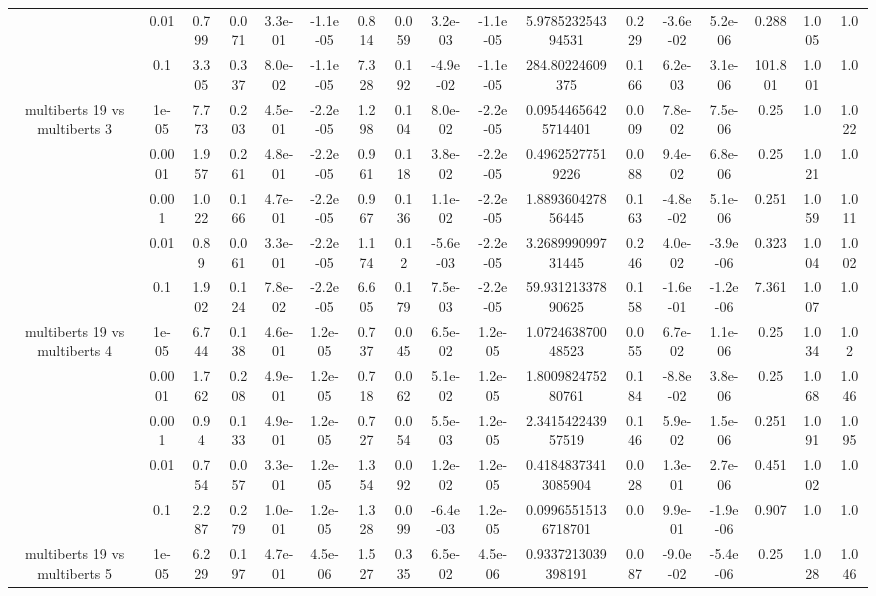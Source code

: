 \begin{tabular}{|c|c|c|c|c|c|c|c|c|c|c|c|c|c|c|c|c|}
 & 0.01 & 0.799 & 0.071 & 3.3e-01 & -1.1e-05 & 0.814 & 0.059 & 3.2e-03 & -1.1e-05 & 5.978523254394531 & 0.229 & -3.6e-02 & 5.2e-06 & 0.288 & 1.005 & 1.0 \\
 & 0.1 & 3.305 & 0.337 & 8.0e-02 & -1.1e-05 & 7.328 & 0.192 & -4.9e-02 & -1.1e-05 & 284.80224609375 & 0.166 & 6.2e-03 & 3.1e-06 & 101.801 & 1.001 & 1.0 \\
\hline
\multirow{5}{*}{multiberts 19 vs multiberts 3} & 1e-05 & 7.773 & 0.203 & 4.5e-01 & -2.2e-05 & 1.298 & 0.104 & 8.0e-02 & -2.2e-05 & 0.09544656425714401 & 0.009 & 7.8e-02 & 7.5e-06 & 0.25 & 1.0 & 1.022 \\
 & 0.0001 & 1.957 & 0.261 & 4.8e-01 & -2.2e-05 & 0.961 & 0.118 & 3.8e-02 & -2.2e-05 & 0.49625277519226 & 0.088 & 9.4e-02 & 6.8e-06 & 0.25 & 1.021 & 1.0 \\
 & 0.001 & 1.022 & 0.166 & 4.7e-01 & -2.2e-05 & 0.967 & 0.136 & 1.1e-02 & -2.2e-05 & 1.889360427856445 & 0.163 & -4.8e-02 & 5.1e-06 & 0.251 & 1.059 & 1.011 \\
 & 0.01 & 0.89 & 0.061 & 3.3e-01 & -2.2e-05 & 1.174 & 0.12 & -5.6e-03 & -2.2e-05 & 3.268999099731445 & 0.246 & 4.0e-02 & -3.9e-06 & 0.323 & 1.004 & 1.002 \\
 & 0.1 & 1.902 & 0.124 & 7.8e-02 & -2.2e-05 & 6.605 & 0.179 & 7.5e-03 & -2.2e-05 & 59.93121337890625 & 0.158 & -1.6e-01 & -1.2e-06 & 7.361 & 1.007 & 1.0 \\
\hline
\multirow{5}{*}{multiberts 19 vs multiberts 4} & 1e-05 & 6.744 & 0.138 & 4.6e-01 & 1.2e-05 & 0.737 & 0.045 & 6.5e-02 & 1.2e-05 & 1.072463870048523 & 0.055 & 6.7e-02 & 1.1e-06 & 0.25 & 1.034 & 1.02 \\
 & 0.0001 & 1.762 & 0.208 & 4.9e-01 & 1.2e-05 & 0.718 & 0.062 & 5.1e-02 & 1.2e-05 & 1.800982475280761 & 0.184 & -8.8e-02 & 3.8e-06 & 0.25 & 1.068 & 1.046 \\
 & 0.001 & 0.94 & 0.133 & 4.9e-01 & 1.2e-05 & 0.727 & 0.054 & 5.5e-03 & 1.2e-05 & 2.341542243957519 & 0.146 & 5.9e-02 & 1.5e-06 & 0.251 & 1.091 & 1.095 \\
 & 0.01 & 0.754 & 0.057 & 3.3e-01 & 1.2e-05 & 1.354 & 0.092 & 1.2e-02 & 1.2e-05 & 0.41848373413085904 & 0.028 & 1.3e-01 & 2.7e-06 & 0.451 & 1.002 & 1.0 \\
 & 0.1 & 2.287 & 0.279 & 1.0e-01 & 1.2e-05 & 1.328 & 0.099 & -6.4e-03 & 1.2e-05 & 0.09965515136718701 & 0.0 & 9.9e-01 & -1.9e-06 & 0.907 & 1.0 & 1.0 \\
\hline
\multirow{5}{*}{multiberts 19 vs multiberts 5} & 1e-05 & 6.229 & 0.197 & 4.7e-01 & 4.5e-06 & 1.527 & 0.335 & 6.5e-02 & 4.5e-06 & 0.9337213039398191 & 0.087 & -9.0e-02 & -5.4e-06 & 0.25 & 1.028 & 1.046 \\

\end{tabular}
